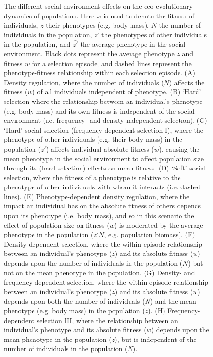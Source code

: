 \documentclass{article}
\begin{document}
\begin{figure} [H]
	\caption{The different social environment effects on the eco-evolutionary dynamics of populations. Here $w$ is used to denote the fitness of individuals, $z$ their phenotypes (e.g. body mass), $N$ the number of individuals in the population, $z’$ the phenotypes of other individuals in the population, and $\bar{z'}$ the average phenotype in the social environment. Black dots represent the average phenotype $\bar{z}$ and fitness $\bar{w}$ for a selection episode, and dashed lines represent the phenotype-fitness relationship within each selection episode. (A) Density regulation, where the number of individuals ($N$) affects the fitness ($w$) of all individuals independent of phenotype. (B) `Hard' selection where the relationship between an individual's phenotype (e.g. body mass) and its own fitness is independent of the social environment (i.e. frequency- and density-independent selection). (C) `Hard' social selection (frequency-dependent selection I), where the phenotype of other individuals (e.g. their body mass) in the population ($z'$) affects individual absolute fitness ($w$), causing the mean phenotype in the social environment to affect population size through its (hard selection) effects on mean fitness. (D) `Soft' social selection, where the fitness of a phenotype is relative to the phenotype of other individuals with whom it interacts (i.e. dashed lines). (E) Phenotype-dependent density regulation, where the impact an individual has on the absolute fitness of others depends upon its phenotype (i.e. body mass), and so in this scenario the effect of population size on fitness ($w$) is moderated by the average phenotype in the population ($\bar{z'}N$, e.g. population biomass). (F) Density-dependent selection, where the within-episode relationship between an individual's phenotype ($z$) and its absolute fitness ($w$) depends upon the number of individuals in the population ($N$) but not on the mean phenotype in the population. (G) Density- and frequency-dependent selection, where the within-episode relationship between an individual's phenotype ($z$) and its absolute fitness ($w$) depends upon both the number of individuals ($N$) and the mean phenotype (e.g. body mass) in the population ($\bar{z}$). (H) Frequency-dependent selection III, where the relationship between an individual's phenotype and its absolute fitness ($w$) depends upon the mean phenotype in the population ($\bar{z}$), but is independent of the number of individuals in the population ($N$).} \label{fig:selection}
\end{figure}
\end{document}
